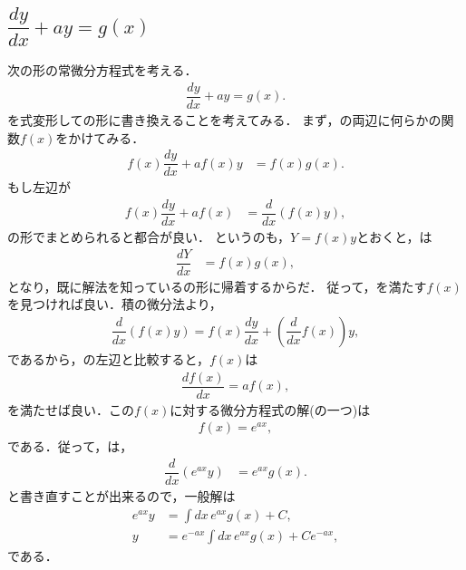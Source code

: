 %
\subsection{$\dfrac{dy}{dx} + a y = g(x)$\label{sec:PDE_03}}
%
次の形の常微分方程式を考える．
\begin{align}
 \dfrac{dy}{dx} + a y = g(x). \label{eq:PDE_03}
\end{align}
を式変形しての形に書き換えることを考えてみる．
まず，の両辺に何らかの関数$f\left(x\right)$をかけてみる．
\begin{align}
 f\left(x\right)\dfrac{dy}{dx}+af\left(x\right)y&=f\left(x\right)g\left(x\right). \label{eq:PDE_03_01}
\end{align}
もし左辺が
\begin{align}
 f\left(x\right)\dfrac{dy}{dx}+af\left(x\right) & =\dfrac{d}{dx}\left(f\left(x\right)y\right), \label{eq:PDE_03_lhs}
\end{align}
の形でまとめられると都合が良い．
というのも，$Y=f\left(x\right)y$とおくと，は
\begin{align}
 \dfrac{dY}{dx} & =f\left(x\right)g\left(x\right), 
\end{align}
となり，既に解法を知っているの形に帰着するからだ．
従って，を満たす$f\left(x\right)$を見つければ良い．積の微分法より，
\begin{align}
 \dfrac{d}{dx}\left(f\left(x\right)y\right)=f\left(x\right)\dfrac{dy}{dx}+\left(\dfrac{d}{dx}f\left(x\right)\right)y, 
\end{align}
であるから，の左辺と比較すると，$f\left(x\right)$は
\begin{align}
 \dfrac{df\left(x\right)}{dx} = af\left(x\right),
\end{align}
を満たせば良い．この$f\left(x\right)$に対する微分方程式の解(の一つ)は
\begin{align}
  f\left(x\right) = e^{ax},
\end{align}
である．従って，は，
\begin{align}
  \dfrac{d}{dx}\left(e^{ax}y\right) & =e^{ax}g\left(x\right).
\end{align}
と書き直すことが出来るので，一般解は
\begin{align}
  e^{ax}y & =\int dx\,e^{ax}g\left(x\right)+C, \\
  y & =e^{-ax}\int dx\,e^{ax}g\left(x\right)+Ce^{-ax},
\end{align}
である．
%

